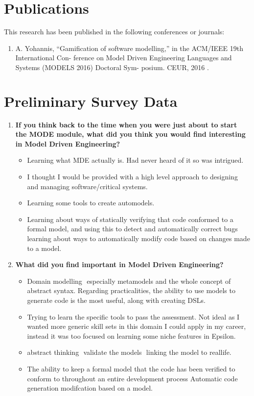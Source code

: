 \documentclass[12pt, a4paper]{report}
\begin{document}
{\begin{appendices}
\chapter{Publications}
This research has been published in the following conferences or journals: 
\begin{enumerate}
 \item A. Yohannis, “Gamiﬁcation of software modelling,” in the ACM/IEEE 19th International Con-
ference on Model Driven Engineering Languages and Systems (MODELS 2016) Doctoral Sym-
posium. CEUR, 2016 \cite{Yohannis2016}.
\end{enumerate}

\chapter{Preliminary Survey Data}
\label{chap:Preliminary Survey Data}

\begin{enumerate}
\item \textbf{If you think back to the time when you were just about to start the MODE module, what did you think you would find interesting in Model ­Driven Engineering?}
\begin{itemize}
\item Learning what MDE actually is. Had never heard of it so was intrigued.
\item I thought I would be provided with a high level approach to designing and managing software/critical systems.
\item Learning some tools to create auto­models.
\item Learning about ways of statically verifying that code conformed to a formal model, and using this to detect and automatically correct bugs learning about ways to automatically modify code based on changes made to a model.
\end{itemize}

\item \textbf{What did you find important in Model­ Driven Engineering?}
\begin{itemize}
\item Domain modelling ­ especially metamodels and the whole concept of abstract syntax. Regarding practicalities, the ability to use models to generate code is the most useful, along with creating DSLs.
\item Trying to learn the specific tools to pass the assessment. Not ideal as I wanted more generic
skill sets in this domain I could apply in my career, instead it was too focused on learning some niche features in Epsilon.
\item abstract thinking ­ validate the models ­ linking the model to real­life.
\item The ability to keep a formal model that the code has been verified to conform to throughout
an entire development process Automatic code generation modifcation based on a model.
\end{itemize}


\end{enumerate}
\end{appendices}}
\end{document}
